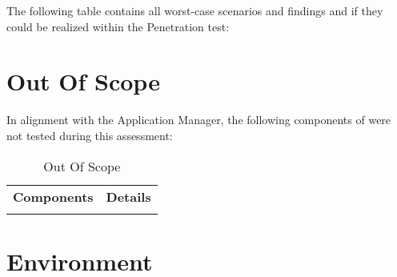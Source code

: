 {\clearpage
The following table contains all worst-case scenarios and findings and if they could be realized within the Penetration test:
\WorstCaseScenariosReport


\clearpage
\section{Out Of Scope}
\label{section:OutOfScope}

In alignment with the Application Manager, the following components of \textbf{\TargetInfoName} were not tested during this assessment:

\begin{xltabular}{\textwidth}{|l|X|}
	\hline
	 \textbf{Components} &  \textbf{Details}  \\
	\OutOfScope
	\hline
	\caption{Out Of Scope} \label{table:OutOfScope}
\end{xltabular}


\section{Environment}
\label{section:Environment}

\Environment
}









